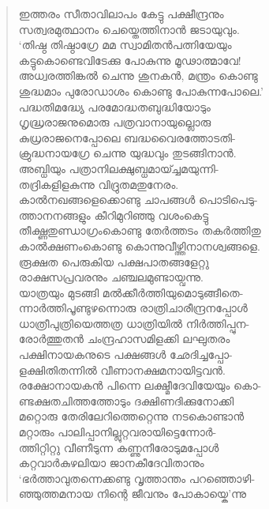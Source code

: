 \begin{verse}
ഇത്തരം സീതാവിലാപം കേട്ടു പക്ഷീന്ദ്രനും\\
സത്വരമുത്ഥാനം ചെയ്തെത്തിനാന്‍ ജടായുവും.\\
‘തിഷ്ഠ തിഷ്ഠാഗ്രേ മമ സ്വാമിതന്‍പത്നിയേയും\\
കട്ടുകൊണ്ടെവിടേക്കു പോകുന്നു മൂഢാത്മാവേ!\\
അധ്വരത്തിങ്കല്‍ ചെന്നു ശുനകന്‍, മന്ത്രം കൊണ്ടു\\
ശുദ്ധമാം പുരോഡാശം കൊണ്ടു പോകുന്നപോലെ.’\\
പദ്ധതിമദ്ധ്യേ പരമോദ്ധതബുദ്ധിയോടും\\
ഗൃദ്ധ്രരാജനുമൊരു പത്രവാനായുല്ലൊരു\\
കുധ്രരാജനെപ്പോലെ ബദ്ധവൈരത്തോടതി-\\
ക്രുദ്ധനായഗ്രേ ചെന്നു യുദ്ധവും തുടങ്ങിനാന്‍.\\
അബ്ധിയും പത്രാനിലക്ഷുബ്ധമായ്ച്ചമയുന്നി-\\
തദ്രികളിളകുന്നു വിദ്രുതമതുനേരം.\\
കാല്‍നഖങ്ങളെക്കൊണ്ടു ചാപങ്ങള്‍ പൊടിപെടു-\\
ത്താനനങ്ങളും കീറിമുറിഞ്ഞു വശംകെട്ടു\\
തീക്ഷ്ണതുണ്ഡാഗ്രംകൊണ്ടു തേര്‍ത്തടം തകര്‍ത്തിതു\\
കാല്‍ക്ഷണംകൊണ്ടു കൊന്നുവീഴ്ത്തിനാനശ്വങ്ങളെ.\\
രൂക്ഷത പെരുകിയ പക്ഷപാതങ്ങളേറ്റു\\
രാക്ഷസപ്രവരനും ചഞ്ചലമുണ്ടായ്വന്നു.\\
യാത്രയും മുടങ്ങി മല്‍ക്കീര്‍ത്തിയുമൊടുങ്ങീതെ-\\
ന്നാര്‍ത്തിപൂണ്ടുഴന്നൊരു രാത്രിചാരീന്ദ്രനപ്പോള്‍\\
ധാത്രീപുത്രിയെത്തത്ര ധാത്രിയില്‍ നിര്‍ത്തിപ്പുന-\\
രോര്‍ത്തുതന്‍ ചംന്ദ്രഹാസമിളക്കി ലഘുതരം\\
പക്ഷിനായകനുടെ പക്ഷങ്ങള്‍ ഛേദിച്ചപ്പോ-\\
ളക്ഷിതിതന്നില്‍ വീണാനക്ഷമനായിട്ടവന്‍.\\
രക്ഷോനായകന്‍ പിന്നെ ലക്ഷ്മീദേവിയേയും കൊ-\\
ണ്ടക്ഷതചിത്തത്തോടും ദക്ഷിണദിക്കുനോക്കി\\
മറ്റൊരു തേരിലേറിത്തെറ്റെന്നു നടകൊണ്ടാന്‍\\
മറ്റാരും പാലിപ്പാനില്ലുറ്റവരായിട്ടെന്നോര്‍-\\
ത്തിറ്റിറ്റു വീണീടുന്ന കണ്ണുനീരോടുമപ്പോള്‍\\
കറ്റവാര്‍കുഴലിയാ ജാനകീദേവിതാനും\\
‘ഭര്‍ത്താവുതന്നെക്കണ്ടു വൃത്താന്തം പറഞ്ഞൊഴി-\\
ഞ്ഞുത്തമനായ നിന്റെ ജീവനും പോകായ്കെ’ന്നു\\

\end{verse}
